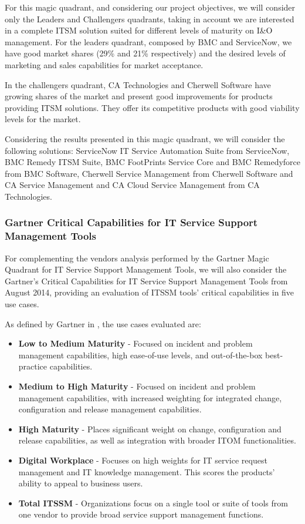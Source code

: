 For this magic quadrant, and considering our project objectives, we will consider only the Leaders and Challengers quadrants, taking in account we are interested in a complete ITSM solution suited for different levels of maturity on I\&O management. For the leaders quadrant, composed by BMC and ServiceNow, we have good market shares (29\% and 21\% respectively) and the desired levels of marketing and sales capabilities for market acceptance.\par 
In the challengers quadrant, CA Technologies and Cherwell Software have growing shares of the market and present good improvements for products providing ITSM solutions. They offer its competitive products with good viability levels for the market.\par
Considering the results presented in this magic quadrant, we will consider the following solutions: ServiceNow IT Service Automation Suite from ServiceNow, BMC Remedy ITSM Suite, BMC FootPrints Service Core and BMC Remedyforce from BMC Software, Cherwell Service Management from Cherwell Software and CA Service Management and CA Cloud Service Management from CA Technologies.\par

\subsubsection{Gartner Critical Capabilities for IT Service Support Management Tools}

For complementing the vendors analysis performed by the Gartner Magic Quadrant for IT Service Support Management Tools, we will also consider the Gartner's Critical Capabilities for IT Service Support Management Tools from August 2014\cite{criticalCapabilitiesITSM}, providing an evaluation of ITSSM tools' critical capabilities in five use cases.\par
As defined by Gartner in \cite{criticalCapabilitiesITSM}, the use cases evaluated are:

\begin{itemize}
\item \textbf{Low to Medium Maturity} - Focused on incident and problem management capabilities, high ease-of-use levels, and out-of-the-box best-practice capabilities.
\item \textbf{Medium to High Maturity} - Focused on incident and problem management capabilities, with increased weighting for integrated change, configuration and release management capabilities.
\item \textbf{High Maturity} - Places significant weight on change, configuration and release capabilities, as well as integration with broader ITOM functionalities.
\item \textbf{Digital Workplace} - Focuses on high weights for IT service request management and IT knowledge management. This scores the products' ability to appeal to business users.
\item \textbf{Total ITSSM} - Organizations focus on a single tool or suite of tools from one vendor to provide broad service support management functions.
\end{itemize}

